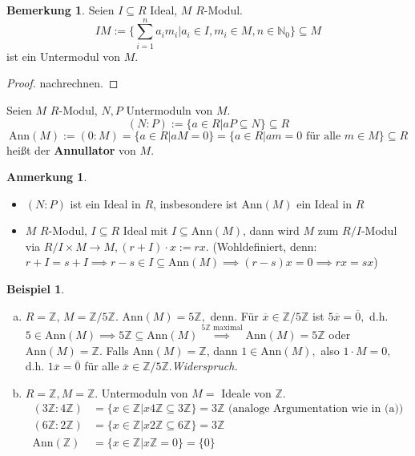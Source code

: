 \documentclass[a4paper, titlepage]{article}
\theoremstyle{definition}
\newtheorem{bsp}[satz]{Beispiel}
\newtheorem{bem}[satz]{Bemerkung}
\newtheorem*{anm}{Anmerkung}
\newcommand{\N}{\mathbb{N}}
\newcommand{\Z}{\mathbb{Z}}
\newcommand{\Ann}{\mathrm{Ann}}
\begin{document}
        \begin{bem}
        Seien $I\subseteq R$ Ideal, $M$ $R$-Modul.
        $$IM:=\{\sum_{i=1}^{n}a_im_i|a_i\in I, m_i\in M,n\in \N_0\}\subseteq M$$
        ist ein Untermodul von $M.$
        \end{bem}
        \begin{proof}
            nachrechnen.
        \end{proof}
        \begin{definition}
            Seien $M$ $R$-Modul, $N,P$ Untermoduln von $M$.
            $$(N:P):=\{a\in R|aP\subseteq N\}\subseteq R$$
            $$\Ann(M):=(0:M)=\{a\in R|aM=0\}=\{a\in R |am=0\text{ für alle }m\in M\}\subseteq R$$ heißt der \textbf{Annullator} von $M$.
        \end{definition}
        \begin{anm}
            \begin{itemize}
                \item $(N:P)$ ist ein Ideal in $R$, insbesondere ist $\Ann(M)$ ein Ideal in $R$
                \item $M$ $R$-Modul, $I\subseteq R$ Ideal mit $I\subseteq \Ann(M)$, dann wird $M$ zum $R/I$-Modul via $R/I\times M\longrightarrow M, (r+I)\cdot x:=rx.$ (Wohldefiniert, denn: $r+I=s+I\implies r-s\in I\subseteq \Ann(M)\implies (r-s)x=0\implies rx=sx$)
            \end{itemize}
        \end{anm}
        \begin{bsp}
            \begin{enumerate}[(a)]
                \item $R=\Z$, $M=\Z/5\Z.$ \newline 
                $\Ann(M)=5\Z,$ denn. Für $\overline{x}\in \Z/5\Z$ ist $5\overline{x}=\overline{0},$ d.h. $5\in \Ann(M)\implies 5\Z\subseteq \Ann(M)\overset{5\Z\text{ maximal}}{\implies}\Ann(M)=5\Z$ oder $\Ann(M)=\Z.$ Falls $\Ann(M)=\Z$, dann $1\in \Ann(M),$ also $1\cdot M=0,$ d.h. $1\overline{x}=\overline{0}$ für alle $\overline{x}\in \Z/5\Z.$\newline\textit{Widerspruch.}
                \item $R=\Z,M=\Z.$ Untermoduln von $M=$ Ideale von $\Z.$ 
                \begin{align*}
                    (3\Z:4\Z)&=\{x\in \Z|x4\Z\subseteq 3\Z\}=3\Z \text{ (analoge Argumentation wie in (a))}\\
                    (6\Z:2\Z)&=\{x\in \Z|x2\Z\subseteq 6\Z\}=3\Z\\
                    \Ann(\Z)&=\{x\in \Z|x\Z=0\}=\{0\}
                \end{align*}
            \end{enumerate}
        \end{bsp}
\end{document}
